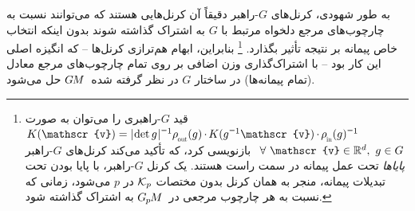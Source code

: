 به طور شهودی، کرنل‌های $G$-راهبر دقیقاً آن کرنل‌هایی هستند که می‌توانند نسبت به چارچوب‌های مرجع دلخواه مرتبط با $G$ به اشتراک گذاشته شوند بدون اینکه انتخاب خاص پیمانه بر نتیجه تأثیر بگذارد.%
\footnote{
	قید $G$-راهبری را می‌توان به صورت
	${K(\mathscr{v}) = \detg^{\minus1} \rhoout(g) \mkern-1mu\cdot\mkern-1.5mu K(g^{\minus1}\mathscr{v}) \mkern-1mu\cdot\mkern-1.5mu \rhoin(g)^{\minus1}}$
	$\mkern8mu \forall\ \mathscr{v} \in \R^d,\ g\in G$
	بازنویسی کرد، که تأکید می‌کند کرنل‌های $G$-راهبر \emph{پایاها} تحت عمل پیمانه در سمت راست هستند.
	یک کرنل $G$-راهبر، با پایا بودن تحت تبدیلات پیمانه، منجر به همان کرنل بدون مختصات $\mathcal{K}_p$ در $p$ می‌شود، زمانی که نسبت به هر چارچوب مرجعی در~$G_{\mkern-1.3mu p}\mkern-1.2muM$ به اشتراک گذاشته شود.
}
بنابراین، ابهام هم‌ترازی کرنل‌ها -- که انگیزه اصلی این کار بود -- با اشتراک‌گذاری وزن اضافی بر روی تمام چارچوب‌های مرجع معادل (تمام پیمانه‌ها) در ساختار $G$ در نظر گرفته شده~$G\mkern-1.4muM$ حل می‌شود.


